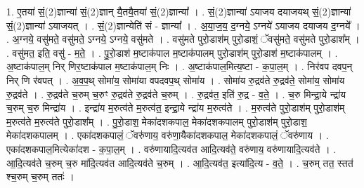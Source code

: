 \documentclass[17pt]{extarticle}
\begin{document}
1. ए॒तया॑ सं॒(2)ज्ञान्या॑ सं॒(2)ज्ञान् यै॒तयै॒तया॑ सं॒(2)ज्ञान्या᳚ । . सं॒(2)ज्ञान्या॑ ऽयाजय दयाजयथ् सं॒(2)ज्ञान्या॑ सं॒(2)ज्ञान्या॑ ऽयाजयत् । . सं॒(2)ज्ञान्येति॑ सं - ज्ञान्या᳚ । . अ॒या॒ज॒य॒ द॒ग्नये॒ ऽग्नये॑ ऽयाजय दयाजय द॒ग्नये᳚ । . अ॒ग्नये॒ वसु॑मते॒ वसु॑मते॒ ऽग्नये॒ ऽग्नये॒ वसु॑मते । . वसु॑मते पुरो॒डाश॑म् पुरो॒डाशं॒ ॅवसु॑मते॒ वसु॑मते पुरो॒डाश᳚म् । . वसु॑मत॒ इति॒ वसु॑ - म॒ते॒ । . पु॒रो॒डाश॑ म॒ष्टाक॑पाल म॒ष्टाक॑पालम् पुरो॒डाश॑म् पुरो॒डाश॑ म॒ष्टाक॑पालम् । . अ॒ष्टाक॑पाल॒म् निर् णिर॒ष्टाक॑पाल म॒ष्टाक॑पाल॒म् निः । . अ॒ष्टाक॑पाल॒मित्य॒ष्टा - क॒पा॒ल॒म् । . निर॑वप दवप॒न् निर् णि र॑वपत् । . अ॒व॒प॒थ् सोमा॑य॒ सोमा॑या वपदवप॒थ् सोमा॑य । . सोमा॑य रु॒द्रव॑ते रु॒द्रव॑ते॒ सोमा॑य॒ सोमा॑य रु॒द्रव॑ते । . रु॒द्रव॑ते च॒रुम् च॒रुꣳ रु॒द्रव॑ते रु॒द्रव॑ते च॒रुम् । . रु॒द्रव॑त॒ इति॑ रु॒द्र - व॒ते॒ । . च॒रु मिन्द्रा॒ये न्द्रा॑य च॒रुम् च॒रु मिन्द्रा॑य । . इन्द्रा॑य म॒रुत्व॑ते म॒रुत्व॑त॒ इन्द्रा॒ये न्द्रा॑य म॒रुत्व॑ते । . म॒रुत्व॑ते पुरो॒डाश॑म् पुरो॒डाश॑म् म॒रुत्व॑ते म॒रुत्व॑ते पुरो॒डाश᳚म् । . पु॒रो॒डाश॒ मेका॑दशकपाल॒ मेका॑दशकपालम् पुरो॒डाश॑म् पुरो॒डाश॒ मेका॑दशकपालम् । . एका॑दशकपालं॒ ॅवरु॑णाय॒ वरु॑णा॒यैका॑दशकपाल॒ मेका॑दशकपालं॒ ॅवरु॑णाय । . एका॑दशकपाल॒मित्येका॑दश - क॒पा॒ल॒म् । . वरु॑णायादि॒त्यव॑त आदि॒त्यव॑ते॒ वरु॑णाय॒ वरु॑णायादि॒त्यव॑ते । . आ॒दि॒त्यव॑ते च॒रुम् च॒रु मा॑दि॒त्यव॑त आदि॒त्यव॑ते च॒रुम् । . आ॒दि॒त्यव॑त॒ इत्या॑दि॒त्य - व॒ते॒ । . च॒रुम् तत॒ स्तत॑ श्च॒रुम् च॒रुम् ततः॑ । \newline
\end{document}
